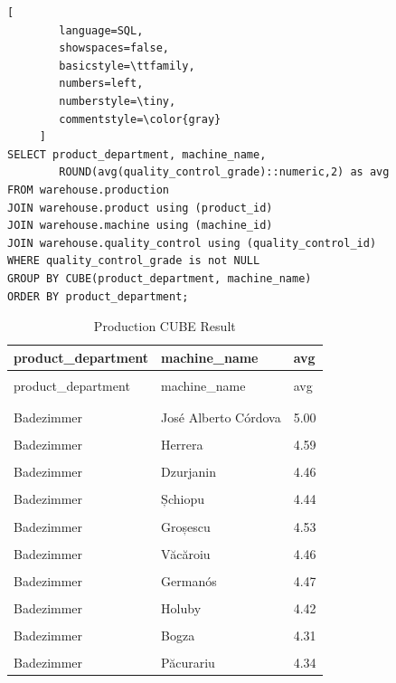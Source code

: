 \documentclass[letterpaper,12pt]{article}
\begin{document}
\begin{lstlisting}[
        language=SQL,
        showspaces=false,
        basicstyle=\ttfamily,
        numbers=left,
        numberstyle=\tiny,
        commentstyle=\color{gray}
     ]
SELECT product_department, machine_name, 
        ROUND(avg(quality_control_grade)::numeric,2) as avg
FROM warehouse.production
JOIN warehouse.product using (product_id)
JOIN warehouse.machine using (machine_id)
JOIN warehouse.quality_control using (quality_control_id)
WHERE quality_control_grade is not NULL
GROUP BY CUBE(product_department, machine_name)
ORDER BY product_department;	
\end{lstlisting}

\begingroup
\renewcommand\arraystretch{0.5}
\begin{longtable}{p{4cm}p{4.3cm}p{2cm}}
        \caption{Production CUBE Result} \\
	product\_department & machine\_name & avg \\
        \endfirsthead \\
        product\_department & machine\_name & avg \\
        \endhead \\
        \hline \\
        Badezimmer & José Alberto Córdova & 5.00 \\
        \hline \\
        Badezimmer & Herrera & 4.59 \\
        \hline \\
        Badezimmer & Dzurjanin & 4.46 \\
        \hline \\
        Badezimmer & Șchiopu & 4.44 \\
        \hline \\
        Badezimmer & Groșescu & 4.53 \\
        \hline \\
        Badezimmer & Văcăroiu & 4.46 \\
        \hline \\
        Badezimmer & Germanós & 4.47 \\
        \hline \\
        Badezimmer & Holuby & 4.42 \\
        \hline \\
        Badezimmer & Bogza & 4.31 \\
        \hline \\
        Badezimmer & Păcurariu & 4.34 \\

\end{longtable}
\end{document}
